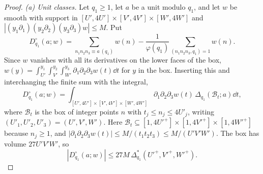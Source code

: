 \documentclass[11pt,colorlinks]{charlie}
\begin{document}
\begin{proof}
\emph{(a) Unit classes.} Let $q_1\ge1$, let $a$ be a unit modulo $q_1$, and let $w$ be smooth with support in $[U',4U']\times[V',4V']\times[W',4W']$ and $|(y_1\partial_1)(y_2\partial_2)(y_3\partial_3)w|\le M$. Put
\[
 D^\circ_{q_1}(a;w)=\sum_{n_1n_2n_3\equiv a\ (q_1)}w(n)-\frac1{\varphi(q_1)}\sum_{(n_1n_2n_3,q_1)=1}w(n).
\]
Since $w$ vanishes with all its derivatives on the lower faces of the box, $w(y)=\int_{U'}^{y_1}\int_{V'}^{y_2}\int_{W'}^{y_3}\partial_1\partial_2\partial_3w(t)\dd t$ for $y$ in the box. Inserting this and interchanging the finite sum with the integral,
\[
 D^\circ_{q_1}(a;w)=\int_{[U',4U']\times[V',4V']\times[W',4W']}\partial_1\partial_2\partial_3w(t)\,\Delta_{q_1}(\mathcal B_t;a)\dd t,
\]
where $\mathcal B_t$ is the box of integer points $n$ with $t_j\le n_j\le4U'_j$, writing $(U'_1,U'_2,U'_3)=(U',V',W')$. Here $\mathcal B_t\subseteq[1,4U'^+]\times[1,4V'^+]\times[1,4W'^+]$ because $n_j\ge1$, and $|\partial_1\partial_2\partial_3w(t)|\le M/(t_1t_2t_3)\le M/(U'V'W')$. The box has volume $27U'V'W'$, so
\begin{equation}\label{eq:unitsmooth}
 |D^\circ_{q_1}(a;w)|\le27M\,\Delta^*_{q_1}(U'^+,V'^+,W'^+).
\end{equation}


\end{proof}
\end{document}
